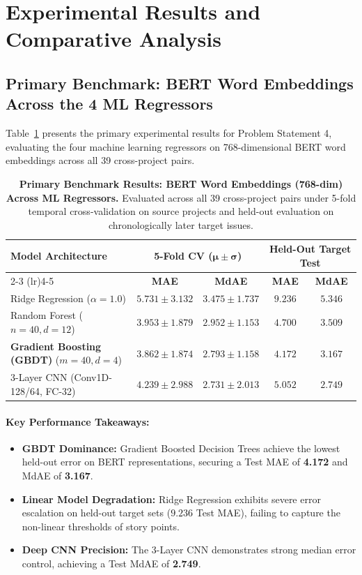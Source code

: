 \documentclass[11pt,a4paper]{article}
\begin{document}
\section{Experimental Results and Comparative Analysis}
\label{sec:results}

\subsection{Primary Benchmark: BERT Word Embeddings Across the 4 ML Regressors}
Table~\ref{tab:bert_primary} presents the primary experimental results for Problem Statement 4, evaluating the four machine learning regressors on 768-dimensional BERT word embeddings across all 39 cross-project pairs.

\begin{table}[H]
\centering
\small
\caption{\textbf{Primary Benchmark Results: BERT Word Embeddings (768-dim) Across ML Regressors.} Evaluated across all 39 cross-project pairs under 5-fold temporal cross-validation on source projects and held-out evaluation on chronologically later target issues.}
\label{tab:bert_primary}
\begin{tabularx}{\linewidth}{@{} X cccc @{}}
\toprule
\multirow{2}{*}{\textbf{Model Architecture}} & \multicolumn{2}{c}{\textbf{5-Fold CV ($\bm{\mu \pm \sigma}$)}} & \multicolumn{2}{c}{\textbf{Held-Out Target Test}} \\
\cmidrule(lr){2-3} \cmidrule(lr){4-5}
 & \textbf{MAE} & \textbf{MdAE} & \textbf{MAE} & \textbf{MdAE} \\
\midrule
Ridge Regression ($\alpha=1.0$) & $5.731 \pm 3.132$ & $3.475 \pm 1.737$ & $9.236$ & $5.346$ \\
Random Forest ($n=40, d=12$) & $3.953 \pm 1.879$ & $2.952 \pm 1.153$ & $4.700$ & $3.509$ \\
\textbf{Gradient Boosting (GBDT)} ($m=40, d=4$) & $\mathbf{3.862 \pm 1.874}$ & $\mathbf{2.793 \pm 1.158}$ & $\mathbf{4.172}$ & $\mathbf{3.167}$ \\
3-Layer CNN (Conv1D-128/64, FC-32) & $4.239 \pm 2.988$ & $2.731 \pm 2.013$ & $5.052$ & $\mathbf{2.749}$ \\
\bottomrule
\end{tabularx}
\end{table}

\paragraph{Key Performance Takeaways:}
\begin{itemize}
    \item \textbf{GBDT Dominance:} Gradient Boosted Decision Trees achieve the lowest held-out error on BERT representations, securing a Test MAE of \textbf{4.172} and MdAE of \textbf{3.167}.
    \item \textbf{Linear Model Degradation:} Ridge Regression exhibits severe error escalation on held-out target sets ($9.236$ Test MAE), failing to capture the non-linear thresholds of story points.
    \item \textbf{Deep CNN Precision:} The 3-Layer CNN demonstrates strong median error control, achieving a Test MdAE of \textbf{2.749}.
\end{itemize}
\end{document}

